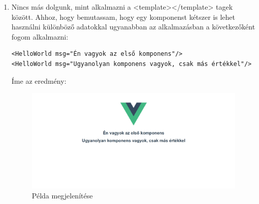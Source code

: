 \begin{enumerate}
 \item Nincs más dolgunk, mint alkalmazni a <template></template> tagek között. Ahhoz, hogy bemutassam, hogy egy komponenst kétszer is lehet használni különböző adatokkal ugyanabban az alkalmazásban a következőként fogom alkalmazni:

\begin{verbatim}
<HelloWorld msg="Én vagyok az első komponens"/>
<HelloWorld msg="Ugyanolyan komponens vagyok, csak más értékkel"/>
\end{verbatim}
Íme az eredmény:
\begin{figure}[h!]
	\centering
	\includegraphics[scale=0.25]{images/1617372108829.png}
	\caption{Példa megjelenítése}
	\label{fig:ff}
	\end{figure}
\end{enumerate}

